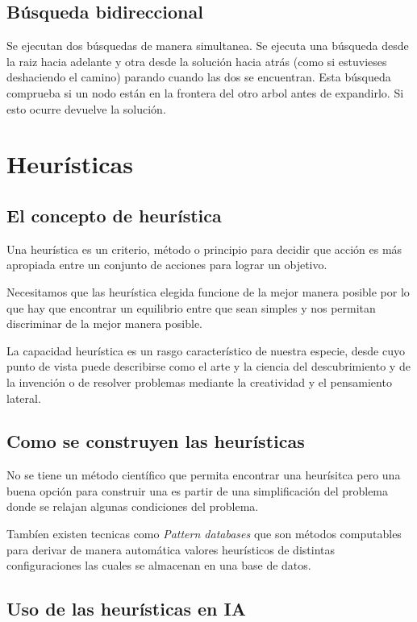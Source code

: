 \documentclass[12pt]{article}
\begin{document}
\subsection{Búsqueda bidireccional}

Se ejecutan dos búsquedas de manera simultanea. Se ejecuta una
búsqueda desde la raiz hacia adelante y otra desde la solución hacia
atrás (como si estuvieses deshaciendo el camino) parando cuando las
dos se encuentran. Esta búsqueda comprueba si un nodo están en la
frontera del otro arbol antes de expandirlo. Si esto ocurre devuelve
la solución.


\section{Heurísticas}

\subsection{El concepto de heurística}

Una heurística es un criterio, método o principio para decidir que acción
es más apropiada entre un conjunto de acciones para lograr un
objetivo.

Necesitamos que las heurística elegida funcione de la mejor manera
posible por lo que hay que encontrar un equilibrio entre que sean
simples y nos permitan discriminar de la mejor manera posible.

La capacidad heurística es un rasgo característico de nuestra especie,
desde cuyo punto de vista puede describirse como el arte y la ciencia
del descubrimiento y de la invención o de resolver problemas mediante
la creatividad y el pensamiento lateral.

\subsection{Como se construyen las heurísticas}

No se tiene un método científico que permita encontrar
una heurísitca pero una buena opción para construir una es partir de
una simplificación del problema donde se relajan algunas condiciones
del problema.

Tambíen existen tecnicas como \textit{Pattern databases} que son
métodos computables para derivar de manera automática valores
heurísticos de distintas configuraciones las cuales se almacenan en
una base de datos.

\subsection{Uso de las heurísticas en IA}
\end{document}
